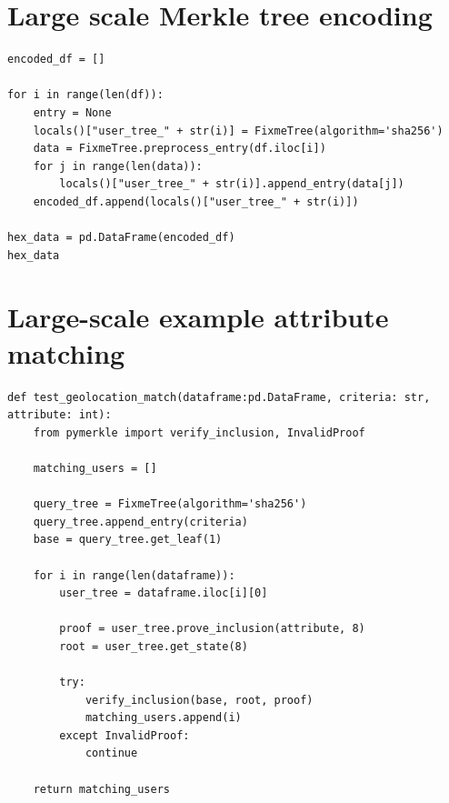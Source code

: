 \documentclass[a4paper,11pt]{report} %
\theoremstyle{change}
\theoremstyle{theoremstyle}
\begin{document}
\section{Large scale Merkle tree encoding}\label{code:large_examp}
\begin{verbatim}
encoded_df = []

for i in range(len(df)):
    entry = None
    locals()["user_tree_" + str(i)] = FixmeTree(algorithm='sha256')
    data = FixmeTree.preprocess_entry(df.iloc[i])
    for j in range(len(data)):
        locals()["user_tree_" + str(i)].append_entry(data[j])
    encoded_df.append(locals()["user_tree_" + str(i)])

hex_data = pd.DataFrame(encoded_df)
hex_data
\end{verbatim}
\section{Large-scale example attribute matching}\label{code:large_verif}
\begin{verbatim}
def test_geolocation_match(dataframe:pd.DataFrame, criteria: str, attribute: int):
    from pymerkle import verify_inclusion, InvalidProof
    
    matching_users = []

    query_tree = FixmeTree(algorithm='sha256')
    query_tree.append_entry(criteria)
    base = query_tree.get_leaf(1)

    for i in range(len(dataframe)):
        user_tree = dataframe.iloc[i][0]

        proof = user_tree.prove_inclusion(attribute, 8)
        root = user_tree.get_state(8)

        try:
            verify_inclusion(base, root, proof)
            matching_users.append(i)
        except InvalidProof:
            continue

    return matching_users
\end{verbatim}

\newpage


\end{document}
